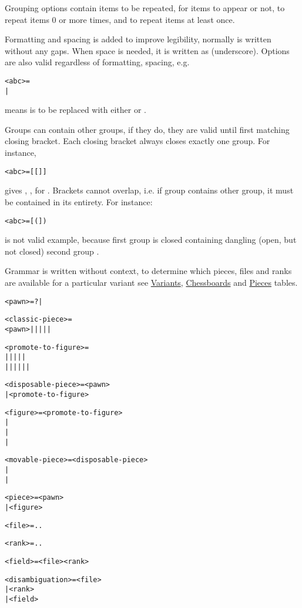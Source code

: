 Grouping options contain items to be repeated, \algfmt{[ ]} for items to appear
or not, \algfmt{( )} to repeat items 0 or more times, and \algfmt{\{ \}} to repeat
items at least once.

Formatting and spacing is added to improve legibility, normally  is
written without any gaps. When space is needed, it is written as \alg{\_}
(underscore). Options are also valid regardless of formatting, spacing, e.g.
\begin{alltt}
<abc> = 
  | 
\end{alltt}
means  is to be replaced with either  or .

Groups can contain other groups, if they do, they are valid until first matching
closing bracket. Each closing bracket always closes exactly one group. For instance,
\begin{alltt}
<abc> = [[]]
\end{alltt}
gives , ,  for .
Brackets cannot overlap, i.e. if group contains other group, it must be contained in
its entirety. For instance:
\begin{alltt}
<abc> = [(])
\end{alltt}
is not valid example, because first group \algfmt{[ ]} is closed containing
dangling (open, but not closed) second group \algfmt{( )}.

Grammar is written without context, to determine which pieces, files and ranks
are available for a particular variant see
\hyperref[tbl:Appendix/Introduction/Variants]{Variants},
\hyperref[tbl:Appendix/Introduction/Chessboards]{Chessboards} and
\hyperref[tbl:Appendix/Introduction/Pieces]{Pieces} tables.

\clearpage %

\begin{alltt}
<pawn> = ? | 

<classic-piece> =
  <pawn> |  |  |  |  | 

<promote-to-figure> =
   |  |  |  |  | 
|  |  |  |  |  | 

<disposable-piece> = <pawn>
                   | <promote-to-figure>

<figure> = <promote-to-figure>
         | 
         | 
         | 

<movable-piece> = <disposable-piece>
                | 
                | 

<piece> = <pawn>
        | <figure>

<file> =  .. 

<rank> =  .. 

<field> = <file><rank>

<disambiguation> = <file>
                 | <rank>
                 | <field>
\end{alltt}

